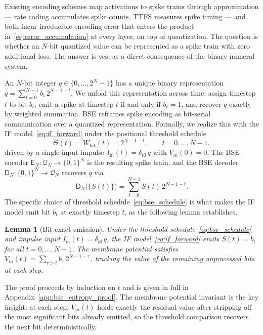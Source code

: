 \documentclass{article}
\theoremstyle{plain}
\newtheorem{lemma}[theorem]{Lemma}
\theoremstyle{definition}
\theoremstyle{remark}
\begin{document}
Existing encoding schemes map activations to spike trains through approximation —
rate coding accumulates spike counts, TTFS measures spike timing — and both incur
irreducible encoding error that enters the product in~\eqref{eq:error_accumulation}
at every layer, on top of quantization. The question is whether an $N$-bit quantized
value can be represented as a spike train with zero additional loss. The answer is
yes, as a direct consequence of the binary numeral system.

An $N$-bit integer $q \in \{0, \dots, 2^N-1\}$ has a unique binary representation
$q = \sum_{t=0}^{N-1} b_t\,2^{N-1-t}$. We unfold this representation across time:
assign timestep $t$ to bit $b_t$, emit a spike at timestep $t$ if and only if
$b_t = 1$, and recover $q$ exactly by weighted summation. BSE reframes spike encoding
as bit-serial communication over a quantized representation.
%
Formally, we realize this with the IF model~\eqref{eq:if_forward} under the
positional threshold schedule
\begin{equation}
\label{eq:bse_schedule}
\Theta(t) = W_{\mathrm{bit}}(t) = 2^{N-1-t}, \qquad t = 0, \dots, N-1,
\end{equation}
driven by a single input impulse $I_{\mathrm{in}}(t) = \delta_{t0}\,q$ with
$V_m(0) = 0$. The BSE encoder $\mathsf{E}_N : \mathcal{Q}_N \to \{0,1\}^N$ is the
resulting spike train, and the BSE decoder $\mathsf{D}_N : \{0,1\}^N \to
\mathcal{Q}_N$ recovers $q$ via
\begin{equation}
\label{eq:bse_decoder}
\mathsf{D}_N\!\big(\{S(t)\}\big) = \sum_{t=0}^{N-1} S(t)\,2^{N-1-t}.
\end{equation}
The specific choice of threshold schedule~\eqref{eq:bse_schedule} is what makes the
IF model emit bit $b_t$ at exactly timestep $t$, as the following lemma establishes.

\begin{lemma}[Bit-exact emission]
\label{lem:bit_exact_main}
Under the threshold schedule~\eqref{eq:bse_schedule} and impulse input
$I_{\mathrm{in}}(t) = \delta_{t0}\,q$, the IF model~\eqref{eq:if_forward} emits
$S(t) = b_t$ for all $t = 0, \dots, N-1$. The membrane potential satisfies
$V_m(t) = \sum_{\tau > t} b_\tau\,2^{N-1-\tau}$, tracking the value of the
remaining unprocessed bits at each step.
\end{lemma}

The proof proceeds by induction on $t$ and is given in full in
Appendix~\ref{app:bse_entropy_proof}. The membrane potential invariant is the key
insight: at each step, $V_m(t)$ holds exactly the residual value after stripping off
the most significant bits already emitted, so the threshold comparison recovers the
next bit deterministically.
\end{document}
